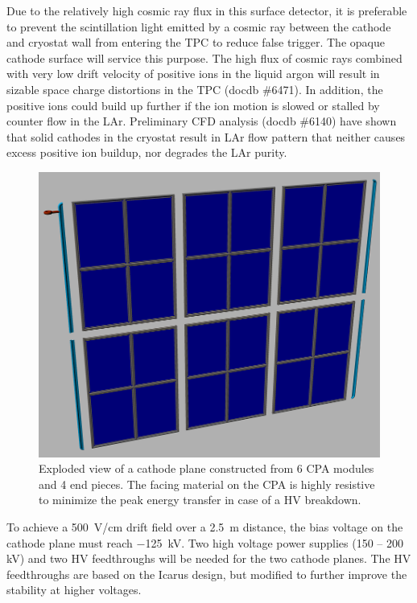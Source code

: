 Due to the relatively high cosmic ray flux in this surface detector, it is preferable to prevent the scintillation light emitted by a cosmic ray between the cathode and cryostat wall from entering the TPC to reduce false trigger. The opaque cathode surface will service this purpose. The high flux of cosmic rays combined with very low drift velocity of positive ions in the liquid argon will result in sizable space charge distortions in the TPC (docdb \#6471).  In addition, the positive ions could build up further if the ion motion is slowed or stalled by counter flow in the LAr.  Preliminary CFD analysis (docdb \#6140) have shown that solid cathodes in the cryostat result in LAr flow pattern that neither causes excess positive ion buildup, nor degrades the LAr purity.


\begin{figure}[t]
\centering
\includegraphics[width=5in]{figures/TPC_CPA_1}
\caption{Exploded view of a cathode plane constructed from 6 CPA modules and 4 end pieces. The facing material on the CPA is highly resistive to minimize the peak energy transfer in case of a HV breakdown.}
\label{fig:tpc_cpa_1}
\end{figure}

To achieve a 500~V/cm drift field over a 2.5~m distance, the bias 
voltage on the cathode plane must reach $-$125~kV. Two high voltage power supplies (150 -- 200 kV) and two HV feedthroughs will be needed for the two cathode planes.  The HV feedthroughs are based on the Icarus design, but modified to further improve the stability at higher voltages. %

